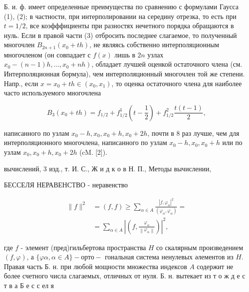 \documentclass[10pt]{article}
\begin{document}
Б. и. ф. имеет определенные преимущества по сравнению с формулами Гаусса (1), (2); в частности, при интерполировании на середину отрезка, то есть при $t=1 / 2$, все коэфффициенты при разностях нечетного порядка обращаются в нуль. Если в правой части (3) отбросить последнее слагаемое, то полученный многочлен $B_{2 n+1}\left(x_{0}+t h\right)$, не являясь собственно интерполяционным многочленом (он совпадает с $f(x)$ лишь в $2 n$ узлах $\left.x_{0}-(n-1) h, \ldots, x_{0}+n h\right)$, обладает лучшей оценкой остаточного члена (см. Интерполяционная бормула), чем интерполяционный многочлен той же степени. Напр., если $x=x_{0}+t h \in\left(x_{0}, x_{1}\right)$, то оценка остаточного члена для наиболее часто используемого многочлена



\[

B_{3}\left(x_{0}+t h\right)=f_{1 / 2}+f_{1 / 2}^{1}\left(t-\frac{1}{2}\right)+f_{1 / 2}^{2} \frac{t(t-1)}{2},

\]



написанного по узлам $x_{0}-h, x_{0}, x_{0}+h, x_{0}+2 h$, почти в 8 раз лучше, чем для интерполяционного многочлена, написанного по узлам $x_{0}-h, x_{0}, x_{0}+h$ или по узлам $x_{0}, x_{0}+h, x_{0}+2 h$ (cM. [2]).



вычислений, 3 изд., т. И. С., Ж и д к о в Н. П., Методы вычислении,



БЕССЕЛЯ НЕРАВЕНСТВО - неравенство



\[

\begin{aligned}

\|f\|^{2} & =(f, f) \geqslant \sum_{\alpha \in A} \frac{\left|f, \varphi_{\alpha}\right|^{2}}{\left(\varphi_{\alpha}, \varphi_{\alpha}\right)}= \\

& =\sum_{\alpha \in A}\left|\left(f, \frac{\varphi_{\alpha}}{\left\|\varphi_{\alpha}\right\|}\right)\right|^{2},

\end{aligned}

\]



где $f$ - элемент (пред)гильбертова пространства $H$ со скалярным произведением $(f, \varphi)$, а $\{\varphi \alpha, \alpha \in A\}-о р т о-$ гональная система ненулевых әлементов из $H$. Правая часть Б. н. при любой мощности множества индексов $A$ содержит не более счетного числа слагаемых, отличных от нуля. Б. н. вытекает из т о ж д е с т в а Б е с с ел я
\end{document}
